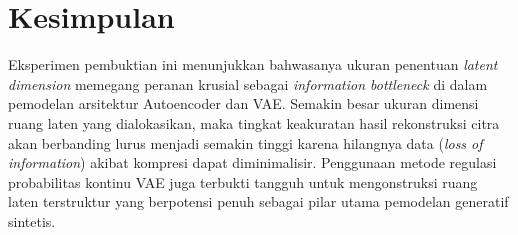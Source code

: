 \documentclass[12pt,titlepage]{article}
\begin{document}
\section{Kesimpulan}
Eksperimen pembuktian ini menunjukkan bahwasanya ukuran penentuan \textit{latent dimension} memegang peranan krusial sebagai \textit{information bottleneck} di dalam pemodelan arsitektur Autoencoder dan VAE. Semakin besar ukuran dimensi ruang laten yang dialokasikan, maka tingkat keakuratan hasil rekonstruksi citra akan berbanding lurus menjadi semakin tinggi karena hilangnya data (\textit{loss of information}) akibat kompresi dapat diminimalisir. Penggunaan metode regulasi probabilitas kontinu VAE juga terbukti tangguh untuk mengonstruksi ruang laten terstruktur yang berpotensi penuh sebagai pilar utama pemodelan generatif sintetis.
\end{document}
